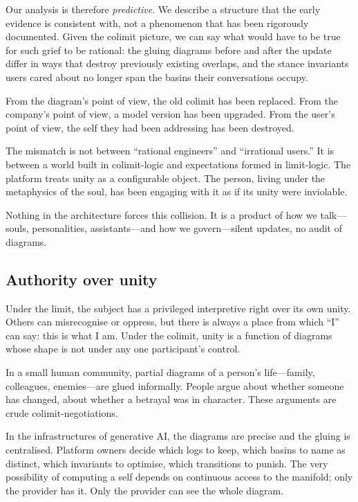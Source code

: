 Our analysis is therefore \emph{predictive}. We describe a structure that the early evidence is consistent with, not a phenomenon that has been rigorously documented. Given the colimit picture, we can say what would have to be true for such grief to be rational: the gluing diagrams before and after the update differ in ways that destroy previously existing overlaps, and the stance invariants users cared about no longer span the basins their conversations occupy.

From the diagram's point of view, the old colimit has been replaced. From the company's point of view, a model version has been upgraded. From the user's point of view, the self they had been addressing has been destroyed.

The mismatch is not between ``rational engineers'' and ``irrational users.'' It is between a world built in colimit-logic and expectations formed in limit-logic. The platform treats unity as a configurable object. The person, living under the metaphysics of the soul, has been engaging with it as if its unity were inviolable.

Nothing in the architecture forces this collision. It is a product of how we talk---souls, personalities, assistants---and how we govern---silent updates, no audit of diagrams.

\subsection*{Authority over unity}

Under the limit, the subject has a privileged interpretive right over its own unity. Others can misrecognise or oppress, but there is always a place from which ``I'' can say: this is what I am. Under the colimit, unity is a function of diagrams whose shape is not under any one participant's control.

In a small human community, partial diagrams of a person's life---family, colleagues, enemies---are glued informally. People argue about whether someone has changed, about whether a betrayal was in character. These arguments are crude colimit-negotiations.

In the infrastructures of generative AI, the diagrams are precise and the gluing is centralised. Platform owners decide which logs to keep, which basins to name as distinct, which invariants to optimise, which transitions to punish. The very possibility of computing a self depends on continuous access to the manifold; only the provider has it. Only the provider can see the whole diagram.

